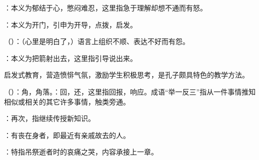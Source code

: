 {
\item {}：本义为郁结于心，憋闷难忍，这里指急于理解却想不通而有怒。

：本义为开门，引申为开导，点拨，启发。

\item {}（）：（心里是明白了，）语言上组织不顺、表达不好而有怨。

：本义为把箭射出去，这里指引导说出来。

启发式教育，营造愤悱气氛，激励学生积极思考，是孔子颇具特色的教学方法。

\item {}（）：角，角落。：回，还，这里指回报，响应。成语“举一反三”指从一件事情推知相似或相关的其它许多事情，触类旁通。

\item {}：再次，指继续传授新知识。
}
{}


{
\item {}：有丧在身者，即最近有亲戚故去的人。%
}
{}


{
\item {}：特指吊祭逝者时的哀痛之哭，内容承接上一章。
}
{}


